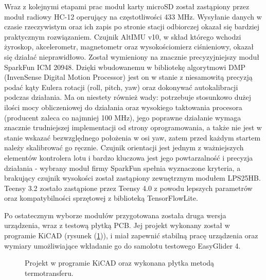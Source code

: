 \documentclass[12pt, a4paper]{article}
\let\oldref\ref
\renewcommand{\ref}[1]{(\oldref{#1})}
\begin{document}
Wraz z kolejnymi etapami prac moduł karty microSD został zastąpiony przez moduł radiowy HC-12 operujący na częstotliwości 433 MHz. Wysyłanie danych w czasie rzeczywistym oraz ich zapis po stronie stacji odbiorczej okazał się bardziej praktycznym rozwiązaniem. Czujnik AltIMU v10, w skład którego wchodzi żyroskop, akcelerometr, magnetometr oraz wysokościomierz ciśnieniowy, okazał się działać nieprawidłowo. Został wymieniony na znacznie precyzyjniejszy moduł SparkFun ICM 20948. Dzięki wbudowanemu w bibliotekę algorytmowi DMP (InvenSense Digital Motion Processor) jest on w stanie z niesamowitą precyzją podać kąty Eulera rotacji (roll, pitch, yaw) oraz dokonywać autokalibracji podczas działania. Ma on niestety również wady: potrzebuje stosunkowo dużej ilości mocy obliczeniowej do działania oraz wysokiego taktowania procesora (producent zaleca co najmniej 100 MHz), jego poprawne działanie wymaga znacznie trudniejszej implementacji od strony oprogramowania, a także nie jest w stanie wskazać bezwzględnego położenia w osi yaw, zatem przed każdym startem należy skalibrować go ręcznie. Czujnik orientacji jest jednym z ważniejszych elementów kontrolera lotu i bardzo kluczowa jest jego powtarzalność i precyzja działania - wybrany moduł firmy SparkFun spełnia wyznaczone kryteria, a brakujący czujnik wysokości został zastąpiony zewnętrznym modułem LPS25HB. Teensy 3.2 zostało zastąpione przez Teensy 4.0 z powodu lepszych parametrów oraz kompatybilności sprzętowej z biblioteką TensorFlowLite.

Po ostatecznym wyborze modułów przygotowana została druga wersja urządzenia, wraz  z testową płytką PCB. Jej projekt wykonany został w programie KiCAD (rysunek \ref{fig:stara}), i miał zapewnić stabilną pracę urządzenia oraz wymiary umożliwiające wkładanie go do samolotu testowego EasyGlider 4. 

\begin{figure}[ht]
    \centering
    \qquad
    \caption{Projekt w programie KiCAD oraz wykonana płytka metodą termotransferu.}
    \label{fig:stara}
\end{figure}
\end{document}

